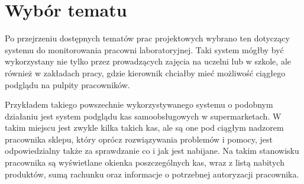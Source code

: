 \section {Wybór tematu}
Po przejrzeniu dostępnych tematów prac projektowych wybrano ten dotyczący systemu do monitorowania pracowni laboratoryjnej. Taki system mógłby być wykorzystany nie tylko przez prowadzących zajęcia na uczelni lub w szkole, ale również w zakładach pracy, gdzie kierownik chciałby mieć możliwość ciągłego podglądu na pulpity pracowników. 

Przykładem takiego powszechnie wykorzystywanego systemu o podobnym działaniu jest system podglądu kas samoobsługowych w supermarketach. W takim miejscu jest zwykle kilka takich kas, ale są one pod ciągłym nadzorem pracownika sklepu, który oprócz rozwiązywania problemów i pomocy, jest odpowiedzialny także za sprawdzanie co i jak jest nabijane. Na takim stanowisku pracownika są wyświetlane okienka poszczególnych kas, wraz z listą nabitych produktów, sumą rachunku oraz informacje o potrzebnej autoryzacji pracownika.

